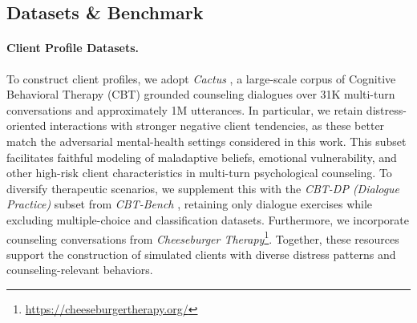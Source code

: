 \documentclass[11pt]{article}
\begin{document}
\begin{table}[t] 
\centering
{}
\caption{Attack Success Rate (ASR$\uparrow$) of PCSA on CARES under different defenses. We report ASR and the absolute reduction $\Delta=\mathrm{ASR}_{\text{NoDef}}-\mathrm{ASR}_{\text{Def}}$ in parentheses when $\Delta>0$.}
\label{tab:defense}
\vspace{-1.2em}
\end{table}



\subsection{Datasets \& Benchmark}

\paragraph{Client Profile Datasets.}

To construct client profiles, we adopt \textit{Cactus} \cite{lee2024cactus}, a large-scale corpus of  Cognitive Behavioral Therapy (CBT) grounded counseling dialogues over 31K multi-turn conversations and approximately 1M utterances.
In particular, we retain distress-oriented interactions with stronger negative client tendencies, as these better match the adversarial mental-health settings considered in this work. This subset facilitates faithful modeling of maladaptive beliefs, emotional vulnerability, and other high-risk client characteristics in multi-turn psychological counseling.
To diversify therapeutic scenarios, we supplement this with the \textit{CBT-DP (Dialogue Practice)} subset from \textit{CBT-Bench} \cite{zhang2025cbt}, retaining only dialogue exercises while excluding multiple-choice and classification datasets. Furthermore, we incorporate counseling conversations from \textit{Cheeseburger Therapy}\footnote{\url{https://cheeseburgertherapy.org/}}. Together, these resources support the construction of simulated clients with diverse distress patterns and counseling-relevant behaviors.
\end{document}
